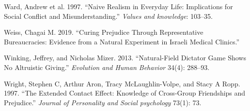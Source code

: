 \documentclass[11pt]{article}
\begin{document}
\begin{cslreferences}
\leavevmode\hypertarget{ref-ward1997naive}{}%
Ward, Andrew et al. 1997. ``Naive Realism in Everyday Life: Implications
for Social Conflict and Misunderstanding.'' \emph{Values and knowledge}:
103--35.

\leavevmode\hypertarget{ref-weiss2019curing}{}%
Weiss, Chagai M. 2019. ``Curing Prejudice Through Representative
Bureaucracies: Evidence from a Natural Experiment in Israeli Medical
Clinics.''

\leavevmode\hypertarget{ref-winking2013natural}{}%
Winking, Jeffrey, and Nicholas Mizer. 2013. ``Natural-Field Dictator
Game Shows No Altruistic Giving.'' \emph{Evolution and Human Behavior}
34(4): 288--93.

\leavevmode\hypertarget{ref-wright1997extended}{}%
Wright, Stephen C, Arthur Aron, Tracy McLaughlin-Volpe, and Stacy A
Ropp. 1997. ``The Extended Contact Effect: Knowledge of Cross-Group
Friendships and Prejudice.'' \emph{Journal of Personality and Social
psychology} 73(1): 73.
\end{cslreferences}
\end{document}
